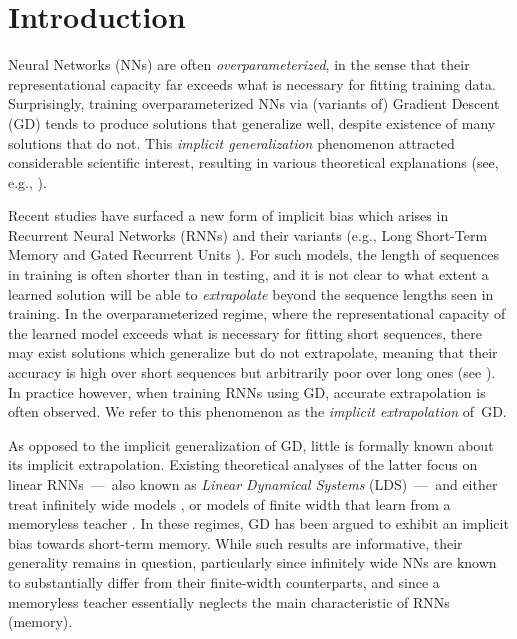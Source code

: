 \section{Introduction}

Neural Networks (NNs) are often \emph{overparameterized}, in the sense that their representational capacity far exceeds what is necessary for fitting training data.
Surprisingly, training overparameterized NNs via (variants of) Gradient Descent (GD) tends to produce solutions that generalize well, despite existence of many solutions that do not.
This \emph{implicit generalization} phenomenon attracted considerable scientific interest, resulting in various theoretical explanations (see, e.g., \cite{woodworth2020kernel,yun2020unifying,ZhangBHRV17,li2020towards,ji2018gradient,lyu2019gradient}).

Recent studies have surfaced a new form of implicit bias which arises in Recurrent Neural Networks (RNNs) and their variants (e.g., Long Short-Term Memory \cite{lstm} and Gated Recurrent Units \cite{chung2014empirical}).
For such models, the length of sequences in training is often shorter than in testing, and it is not clear to what extent a learned solution will be able to \emph{extrapolate} beyond the sequence lengths seen in training.
In the overparameterized regime, where the representational capacity of the learned model exceeds what is necessary for fitting short sequences, there may exist solutions which generalize but do not extrapolate, meaning that their accuracy is high over short sequences but arbitrarily poor over long ones (see \cite{cohen2022extrapolation}). 
In practice however, when training RNNs using GD, accurate extrapolation is often observed. 
We refer to this phenomenon as the \emph{implicit extrapolation} of~GD. 

As opposed to the implicit generalization of GD, little is formally known about its implicit extrapolation. 
Existing theoretical analyses of the latter focus on linear RNNs~---~also known as \emph{Linear Dynamical Systems} (LDS)~---~and either treat infinitely wide models \citep{emami2021implicit}, or models of finite width that learn from a memoryless teacher \citep{cohen2022extrapolation}.
In these regimes, GD has been argued to exhibit an implicit bias towards short-term memory.
While such results are informative, their generality remains in question, particularly since infinitely wide NNs are known to substantially differ from their finite-width counterparts, and since a memoryless teacher essentially neglects the main characteristic of RNNs (memory).

